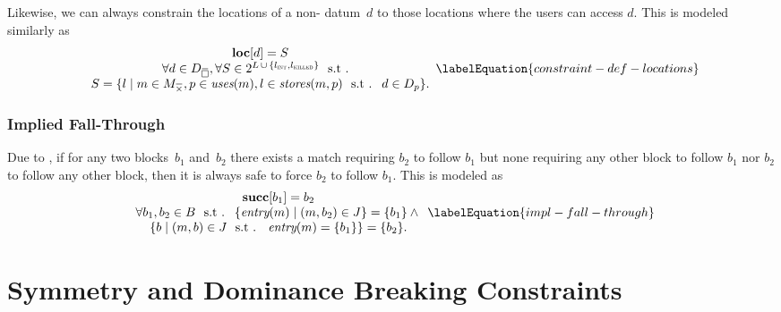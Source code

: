 Likewise, we can always constrain the locations of a non-
\gls{datum}~$d$ to those locations where the users can access $d$.
%
This is modeled similarly as
%
\begin{equation}
  \begin{array}{c}
    \mVar{loc}[d] = S \\
    \forall d \in \mStateDataCompSet,
    \forall S \in
      \mPowerset{\mLocationSet
      \, \cup \,
      \mSet{\mIntLocation, \mKilledLocation}} \text{ \st} \\
    S = \mSetBuilder{l}%
                    {%
                      m \in \mKillMatchCompSet,
                      p \in \mUses(m),
                      l \in \mStores(m, p)
                      \text{ \st }
                      d \in \mDataSet[p]
                    }.
  \end{array}
  \labelEquation{constraint-def-locations}
\end{equation}


\subsubsection{Implied Fall-Through}

Due to , if for any two \glspl{block}~$b_1$ and~$b_2$
there exists a \gls{match} requiring $b_2$ to follow $b_1$ but none requiring
any other \gls{block} to follow $b_1$ nor $b_2$ to follow any other \gls{block},
then it is always safe to force $b_2$ to follow $b_1$.
%
This is modeled as
%
\begin{equation}
  \begin{array}{c}
    \mVar{succ}[b_1] = b_2 \\
    \forall b_1, b_2 \in \mBlockSet
    \text{ \st }
    \mSetBuilder{\mEntry(m)}{\mPair{m}{b_2} \in \mFallThroughSet} = \mSet{b_1}
    \mAnd \mbox{} \\
    \mSetBuilder{b}%
                {%
                  \mPair{m}{b} \in \mFallThroughSet
                  \text{ \st }
                  \mEntry(m) = \mSet{b_1}%
                } = \mSet{b_2}.
  \end{array}
  \labelEquation{impl-fall-through}
\end{equation}


\section{Symmetry and Dominance Breaking Constraints}

